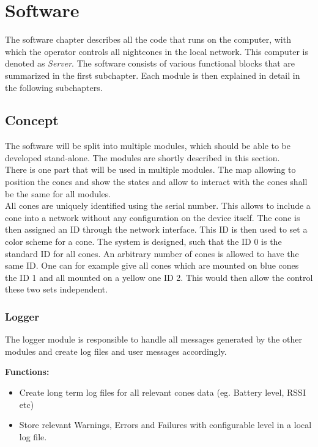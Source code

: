 \section{Software}
The software chapter describes all the code that runs on the computer, with which the operator controls all nightcones in the local network. This computer is denoted as \textit{Server}.  The software consists of various functional blocks that are summarized in the first subchapter. Each module is then explained in detail in the following subchapters. 
\subsection{Concept}
The software will be split into multiple modules, which should be able to be developed stand-alone. The modules are shortly described in this section. \\

There is one part that will be used in multiple modules. The map allowing to position the cones and show the states and allow to interact with the cones shall be the same for all modules. \\

All cones are uniquely identified using the serial number. This allows to include a cone into a network without any configuration on the device itself. The cone is then assigned an ID through the network interface. This ID is then used to set a color scheme for a cone. The system is designed, such that the ID \num{0} is the standard ID for all cones. An arbitrary number of cones is allowed to have the same ID. One can for example give all cones which are mounted on blue cones the ID 1 and all mounted on a yellow one ID 2. This would then allow the control these two sets independent. 

\subsubsection{Logger}
The logger module is responsible to handle all messages generated by the other modules and create log files and user messages accordingly. 

\textbf{Functions:}
\begin{itemize}
	\item Create long term log files for all relevant cones data (eg. Battery level, \ac{RSSI} etc)
	\item Store relevant Warnings, Errors and Failures with configurable level in a local log file. 
\end{itemize}

